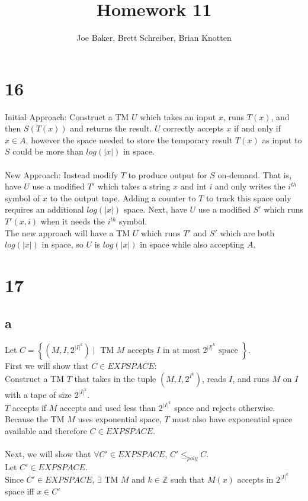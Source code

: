 \documentclass[letterpaper,notitlepage,twoside]{article}
\newcommand{\Z}{\mathbb{Z}} %
\begin{document}
\title{Homework 11}
\author{Joe Baker, Brett Schreiber, Brian Knotten}
\maketitle

\section*{16}
Initial Approach:
Construct a TM $U$ which takes an input $x$, runs $T(x)$, and then $S(T(x))$ and returns the result. $U$ correctly accepts $x$ if and only if $x \in A$, however the space needed to store the temporary result $T(x)$ as input to $S$ could be more than $log(|x|)$ in space.\\\\
New Approach:
Instead modify $T$ to produce output for $S$ on-demand. That is, have $U$ use a modified $T'$ which takes a string $x$ and int $i$ and only writes the $i^{th}$ symbol of $x$ to the output tape. Adding a counter to $T$ to track this space only requires an additional $log(|x|)$ space. Next, have $U$ use a modified $S'$ which runs $T'(x,i)$ when it needs the $i^{th}$ symbol.\\
The new approach will have a TM $U$ which runs $T'$ and $S'$ which are both $log(|x|)$ in space, so $U$ is $log(|x|)$ in space while also accepting $A$.

\section*{17}
\subsection*{a}
Let $C = \left\{ \left( M, I, 2^{|I|^k} \right) \mid \text{ TM } M \text{ accepts } I \text{ in at most } 2^{|I|^k} \text{ space } \right\}$.\\
First we will show that $C \in EXPSPACE$:\\ 
Construct a TM $T$ that takes in the tuple $(M, I, 2^{I^{k}})$, reads $I$, and runs $M$ on $I$ with a tape of size $2^{|I|^{k}}$. \\ 
$T$ accepts if $M$ accepts and used less than $2^{|I|^{k}}$ space and rejects otherwise. \\
Because the TM $M$ uses exponential space, $T$ must also have exponential space available and therefore $C \in EXPSPACE$. \\ \\ 
Next, we will show that $\forall C' \in EXPSPACE$, $C' \leq_{poly} C$. \\
Let $C' \in EXPSPACE$. \\
Since $C' \in EXPSPACE$, $\exists$ TM $M$ and $k \in \Z$ such that $M(x)$ accepts in $2^{|I|^{k}}$ space iff $x \in C'$
\end{document}
